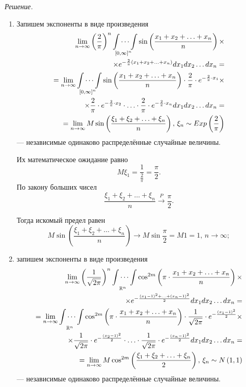 \textit{Решение.}
\begin{enumerate}[label=\alph*)]
\item Запишем экспоненты в виде произведения
\begin{equation*}
\begin{split}
\lim \limits_{n \to \infty } \left( \frac{2}{ \pi } \right)^n
\idotsint \limits_{ \left[ 0, \infty \right]^n}
\sin \left( \frac{x_1 + x_2 + \dotsc + x_n}{n} \right) \times \\
\times e^{- \frac{2}{ \pi } \left( x_1 + x_2 + \dotsc + x_n \right) }
dx_1 dx_2 \dotsc dx_n = \\
= \lim \limits_{n \to \infty } \idotsint \limits_{ \left[ 0, \infty \right]^n}
\sin \left( \frac{x_1 + x_2 + \dotsc + x_n}{n} \right) \cdot
\frac{2}{ \pi } \cdot e^{- \frac{2}{ \pi } \cdot x_1} \times \\
\times \frac{2}{ \pi } \cdot e^{- \frac{2}{ \pi } \cdot x_2} \cdot \dotsc \cdot
\frac{2}{ \pi } \cdot e^{- \frac{2}{ \pi } \cdot x_n} dx_1 dx_2 \dotsc dx_n = \\
= \lim \limits_{n \to \infty } M \sin \left( \frac{ \xi_1 + \xi_2 + \dotsc + \xi_n}{n} \right), \,
\xi_n \sim Exp \left( \frac{2}{ \pi } \right)
\end{split}
\end{equation*}
--- независимые одинаково распределённые случайные величины.

Их математическое ожидание равно
$$M \xi_1 =
\frac{1}{ \frac{2}{ \pi }} =
\frac{ \pi }{2}.$$
По закону больших чисел
$$ \frac{ \xi_1 + \xi_2 + \dotsc + \xi_n}{n} \overset{P}{ \rightarrow } \frac{ \pi }{2}.$$

Тогда искомый предел равен
$$M \sin \left( \frac{ \xi_1 + \xi_2 + \dotsc + \xi_n}{n} \right) \to M \sin \frac{ \pi }{2} =
M1 = 1, \,
n \to \infty;$$
\item запишем экспоненты в виде произведения
\begin{equation*}
\begin{split}
\lim \limits_{n \to \infty } \left( \frac{1}{ \sqrt{2 \pi }} \right)^n
\idotsint \limits_{ \mathbb{R}^n} \cos^{2m}
\left( \pi \cdot \frac{x_1 + x_2 + \dotsc + x_n}{n} \right) \times \\
\times e^{- \frac{ \left( x_1 - 1 \right)^2 + \dotsc + \left( x_n - 1 \right)^2}{2}}
dx_1 dx_2 \dotsc dx_n = \\
= \lim \limits_{n \to \infty } \idotsint \limits_{ \mathbb{R}^n} \cos^{2m}
\left( \pi \cdot \frac{x_1 + x_2 + \dotsc + x_n}{n} \right) \cdot \frac{1}{ \sqrt{2 \pi }} \cdot
e^{- \frac{ \left( x_1 - 1 \right)^2}{2}} \times \\
\times \frac{1}{ \sqrt{2 \pi }} \cdot e^{- \frac{ \left( x_2 - 1 \right)^2}{2}} \cdot \dotsc \cdot
\frac{1}{ \sqrt{2 \pi }} \cdot
e^{- \frac{ \left( x_n - 1 \right)^2}{2}} dx_1 dx_2 \dotsc dx_n = \\
= \lim \limits_{n \to \infty } M \cos^{2m}
\left( \frac{ \xi_1 + \xi_2 + \dotsc + \xi_n}{2} \right), \,
\xi_n \sim N \left( 1, 1 \right)
\end{split}
\end{equation*}
--- независимые одинаково распределённые случайные величины.


\end{enumerate}

